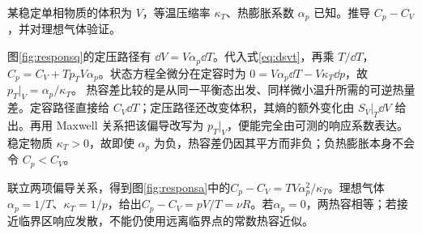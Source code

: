\begin{exercise}[由响应系数求热容差]
某稳定单相物质的体积为 $V$，等温压缩率 $\kappa_T$、热膨胀系数 $\alpha_p$ 已知。推导 $C_p-C_V$，并对理想气体验证。
\end{exercise}
\begin{solution}
图\ref{fig:responsq}的定压路径有 $\dd V=V\alpha_p\dd T$。代入式\eqref{eq:dsvt}，再乘 $T/\dd T$，$C_p=C_V+Tp_TV\alpha_p$。状态方程全微分在定容时为 $0=V\alpha_p\dd T-V\kappa_T\dd p$，故 $p_T|_V=\alpha_p/\kappa_T$。
热容差比较的是从同一平衡态出发、同样微小温升所需的可逆热量差。定容路径直接给 $C_V\dd T$；定压路径还改变体积，其熵的额外变化由 $S_V|_T\dd V$ 给出。再用 Maxwell 关系把该偏导改写为 $p_T|_V$，便能完全由可测的响应系数表达。稳定物质 $\kappa_T>0$，故即使 $\alpha_p$ 为负，热容差仍因其平方而非负；负热膨胀本身不会令 $C_p<C_V$。

联立两项偏导关系，得到图\ref{fig:responsa}中的$C_p-C_V=TV\alpha_p^2/\kappa_T$。理想气体$\alpha_p=1/T$、$\kappa_T=1/p$，给出$C_p-C_V=pV/T=\nu R$。若$\alpha_p=0$，两热容相等；若接近临界区响应发散，不能仍使用远离临界点的常数热容近似。
\end{solution}

